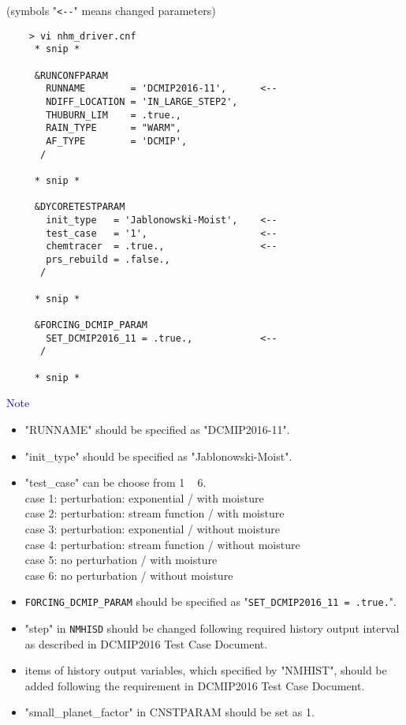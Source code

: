  \vspace{0.5cm}

 (symbols "\verb|<--|" means changed parameters)
 \begin{verbatim}
    > vi nhm_driver.cnf
     * snip *

     &RUNCONFPARAM
       RUNNAME        = 'DCMIP2016-11',      <--
       NDIFF_LOCATION = 'IN_LARGE_STEP2',
       THUBURN_LIM    = .true.,
       RAIN_TYPE      = "WARM",
       AF_TYPE        = 'DCMIP',
      /

     * snip *

     &DYCORETESTPARAM
       init_type   = 'Jablonowski-Moist',    <--
       test_case   = '1',                    <--
       chemtracer  = .true.,                 <--
       prs_rebuild = .false.,
      /

     * snip *

     &FORCING_DCMIP_PARAM
       SET_DCMIP2016_11 = .true.,            <--
      /

     * snip *
 \end{verbatim}


 \noindent \textcolor{blue}{{\sf Note}}
 \begin{itemize}
   \item "RUNNAME" should be specified as "DCMIP2016-11".
   \item "init\_type" should be specified as "Jablonowski-Moist".
   \item "test\_case" can be choose from 1 ~ 6.\\
          case 1: perturbation: exponential / with moisture \\
          case 2: perturbation: stream function / with moisture \\
          case 3: perturbation: exponential / without moisture \\
          case 4: perturbation: stream function / without moisture \\
          case 5: no perturbation / with moisture \\
          case 6: no perturbation / without moisture
   \item \verb|FORCING_DCMIP_PARAM| should be specified as "\verb|SET_DCMIP2016_11 = .true.|".
   \item "step" in \verb|NMHISD| should be changed following required history output interval
           as described in DCMIP2016 Test Case Document.
   \item items of history output variables, which specified by "NMHIST", should be added
         following the requirement in DCMIP2016 Test Case Document.
   \item "small\_planet\_factor" in CNSTPARAM should be set as 1.
 \end{itemize}

